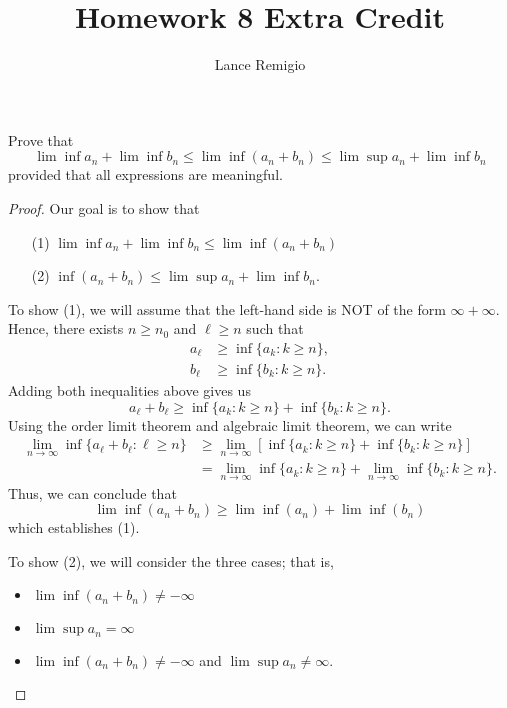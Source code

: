 \documentclass[a4paper]{article}
\title{Homework 8 Extra Credit}
\author{Lance Remigio}
\begin{document}
\maketitle

\begin{problem}
   Prove that  
   \[  \lim \inf {a}_{n} + \lim \inf {b}_{n} \leq \lim \inf({a}_{n} + {b}_{n}) \leq \lim \sup {a}_{n} + \lim \inf {b}_{n}  \]
   provided that all expressions are meaningful.
\end{problem}
\begin{proof}
Our goal is to show that 
\begin{enumerate}
    \item[(1)] \( \lim \inf {a}_{n} + \lim \inf {b}_{n} \leq \lim \inf({a}_{n} + {b}_{n})  \)
    \item[(2)]\( \inf({a}_{n} + {b}_{n}) \leq \lim \sup {a}_{n} + \lim \inf {b}_{n} \). 
\end{enumerate}
To show (1), we will assume that the left-hand side is NOT of the form \( \infty  + \infty   \). Hence, there exists \( n \geq {n}_{0}  \) and \( \ell \geq n  \) such that 
\begin{align*}
    {a}_{\ell} &\geq \inf \{ {a}_{k} : k \geq n  \},  \\
    {b}_{\ell} &\geq \inf \{ {b}_{k} : k \geq n \}. 
\end{align*}
Adding both inequalities above gives us 
\[  {a}_{\ell} + {b}_{\ell} \geq \inf \{ {a}_{k} : k \geq n  \}  + \inf \{ {b}_{k} : k \geq n  \}.  \]
Using the order limit theorem and algebraic limit theorem, we can write
\begin{align*}
    \lim_{ n \to \infty  }  \inf \{ {a}_{\ell } + {b}_{\ell} : \ell \geq n  \}   &\geq \lim_{ n \to \infty  }  [ \inf \{ {a}_{k } : k \geq n  \}  + \inf \{ {b}_{k } : k \geq n  \} ] \\
                                                                                 &= \lim_{ n \to \infty  }  \inf \{ {a}_{k } : k \geq n  \}  + \lim_{ n \to \infty  }  \inf \{ {b}_{k } : k \geq n  \}.
\end{align*}
Thus, we can conclude that 
\[  \lim \inf ({a}_{n} + {b}_{n}) \geq \lim \inf ({a}_{n}) + \lim \inf ({b}_{n}) \]
which establishes (1).

To show (2), we will consider the three cases; that is, 
\begin{itemize}
    \item \( \lim \inf ({a}_{n} + {b}_{n}) \neq -\infty \)
    \item \( \lim \sup {a}_{n} = \infty \)
    \item \( \lim \inf ({a}_{n} + {b}_{n}) \neq - \infty   \) and \( \lim \sup {a}_{n} \neq \infty \).
\end{itemize}


\end{proof}
\end{document}
